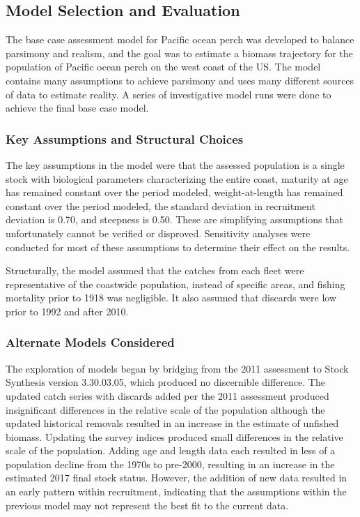 \documentclass[12pt,]{article}
\begin{document}
\subsection{Model Selection and
Evaluation}\label{model-selection-and-evaluation}

The base case assessment model for Pacific ocean perch was developed to
balance parsimony and realism, and the goal was to estimate a biomass
trajectory for the population of Pacific ocean perch on the west coast
of the US. The model contains many assumptions to achieve parsimony and
uses many different sources of data to estimate reality. A series of
investigative model runs were done to achieve the final base case model.

\subsubsection{Key Assumptions and Structural
Choices}\label{key-assumptions-and-structural-choices}

The key assumptions in the model were that the assessed population is a
single stock with biological parameters characterizing the entire coast,
maturity at age has remained constant over the period modeled,
weight-at-length has remained constant over the period modeled, the
standard deviation in recruitment deviation is 0.70, and steepness is
0.50. These are simplifying assumptions that unfortunately cannot be
verified or disproved. Sensitivity analyses were conducted for most of
these assumptions to determine their effect on the results.

Structurally, the model assumed that the catches from each fleet were
representative of the coastwide population, instead of specific areas,
and fishing mortality prior to 1918 was negligible. It also assumed that
discards were low prior to 1992 and after 2010.

\subsubsection{Alternate Models
Considered}\label{alternate-models-considered}

The exploration of models began by bridging from the 2011 assessment to
Stock Synthesis version 3.30.03.05, which produced no discernible
difference. The updated catch series with discards added per the 2011
assessment produced insignificant differences in the relative scale of
the population although the updated historical removals resulted in an
increase in the estimate of unfished biomass. Updating the survey
indices produced small differences in the relative scale of the
population. Adding age and length data each resulted in less of a
population decline from the 1970s to pre-2000, resulting in an increase
in the estimated 2017 final stock status. However, the addition of new
data resulted in an early pattern within recruitment, indicating that
the assumptions within the previous model may not represent the best fit
to the current data.
\end{document}

